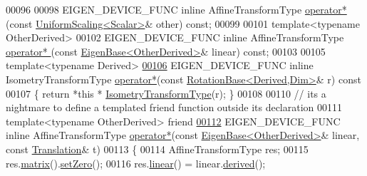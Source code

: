 \begin{DoxyCode}
00096 
00098   EIGEN\_DEVICE\_FUNC \textcolor{keyword}{inline} AffineTransformType \hyperlink{group___geometry___module_abfbbd7dee9da6e449439a138c6ce9068}{operator* }(\textcolor{keyword}{const} 
      \hyperlink{class_eigen_1_1_uniform_scaling}{UniformScaling<Scalar>}& other) \textcolor{keyword}{const};
00099 
00101   \textcolor{keyword}{template}<\textcolor{keyword}{typename} OtherDerived>
00102   EIGEN\_DEVICE\_FUNC \textcolor{keyword}{inline} AffineTransformType \hyperlink{group___geometry___module_abfbbd7dee9da6e449439a138c6ce9068}{operator* }(\textcolor{keyword}{const} 
      \hyperlink{group___core___module_struct_eigen_1_1_eigen_base}{EigenBase<OtherDerived>}& linear) \textcolor{keyword}{const};
00103 
00105   \textcolor{keyword}{template}<\textcolor{keyword}{typename} Derived>
\hyperlink{group___geometry___module_ad39a0cf47e1ffc0fa6d8e223dd0e0e85}{00106}   EIGEN\_DEVICE\_FUNC \textcolor{keyword}{inline} IsometryTransformType \hyperlink{group___geometry___module_ad39a0cf47e1ffc0fa6d8e223dd0e0e85}{operator*}(\textcolor{keyword}{const} 
      \hyperlink{class_eigen_1_1_rotation_base}{RotationBase<Derived,Dim>}& r)\textcolor{keyword}{ const}
00107 \textcolor{keyword}{  }\{ \textcolor{keywordflow}{return} *\textcolor{keyword}{this} * \hyperlink{group___geometry___module_ad3ac890d85420ba78e16dab1983d1a80}{IsometryTransformType}(r); \}
00108 
00110   \textcolor{comment}{// its a nightmare to define a templated friend function outside its declaration}
00111   \textcolor{keyword}{template}<\textcolor{keyword}{typename} OtherDerived> \textcolor{keyword}{friend}
\hyperlink{group___geometry___module_a4ab2405ba944f5cafc9487f147a104ef}{00112}   EIGEN\_DEVICE\_FUNC \textcolor{keyword}{inline} AffineTransformType \hyperlink{group___geometry___module_a4ab2405ba944f5cafc9487f147a104ef}{operator*}(\textcolor{keyword}{const} 
      \hyperlink{group___core___module_struct_eigen_1_1_eigen_base}{EigenBase<OtherDerived>}& linear, \textcolor{keyword}{const} \hyperlink{group___geometry___module_class_eigen_1_1_translation}{Translation}& t)
00113   \{
00114     AffineTransformType res;
00115     res.\hyperlink{group___geometry___module_aec8168000a88a807130d41020af98d47}{matrix}().\hyperlink{class_eigen_1_1_plain_object_base_ac21ad5f989f320e46958b75ac8d9a1da}{setZero}();
00116     res.\hyperlink{group___geometry___module_a535bd63d047c2a36585c3f9b62219a1e}{linear}() = linear.\hyperlink{group___core___module_a324b16961a11d2ecfd2d1b7dd7946545}{derived}();

\end{DoxyCode}
